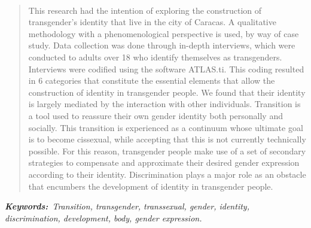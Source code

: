 \begin{center}
	\large\scshape\theengtitle\
\end{center}

\begin{quote}
\small
This research had the intention of exploring the construction of
transgender's identity that live in the city of Caracas. A qualitative
methodology with a phenomenological perspective is used, by way of case
study. Data collection was done through in-depth interviews, which were
conducted to adults over 18 who identify themselves as
transgenders. Interviews were codified using the software ATLAS.ti\@. This
coding resulted in 6 categories that constitute the essential elements that
allow the construction of identity in transgender people. We found that their
identity is largely mediated by the interaction with other individuals.
Transition is a tool used to reassure their own gender identity both
personally and socially. This transition is experienced as a continuum whose
ultimate goal is to become cissexual, while accepting that this is not
currently technically possible. For this reason, transgender people make use
of a set of secondary strategies to compensate and approximate their desired
gender expression according to their identity. Discrimination plays a major
role as an obstacle that encumbers the development of identity in transgender
people.
\end{quote}

\itshape\textbf{Keywords:}\normalfont{}\ Transition, transgender, transsexual,
gender, identity, discrimination, development, body, gender expression.
